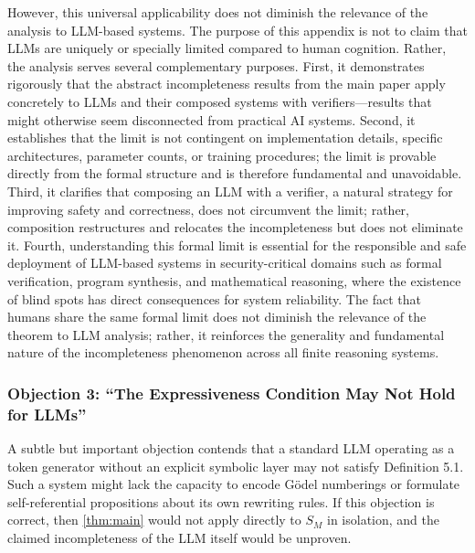 \documentclass[11pt]{article}
\begin{document}
However, this universal applicability does not diminish the relevance of the analysis to LLM-based systems. The purpose of this appendix is not to claim that LLMs are uniquely or specially limited compared to human cognition. Rather, the analysis serves several complementary purposes. First, it demonstrates rigorously that the abstract incompleteness results from the main paper apply concretely to LLMs and their composed systems with verifiers—results that might otherwise seem disconnected from practical AI systems. Second, it establishes that the limit is not contingent on implementation details, specific architectures, parameter counts, or training procedures; the limit is provable directly from the formal structure and is therefore fundamental and unavoidable. Third, it clarifies that composing an LLM with a verifier, a natural strategy for improving safety and correctness, does not circumvent the limit; rather, composition restructures and relocates the incompleteness but does not eliminate it. Fourth, understanding this formal limit is essential for the responsible and safe deployment of LLM-based systems in security-critical domains such as formal verification, program synthesis, and mathematical reasoning, where the existence of blind spots has direct consequences for system reliability. The fact that humans share the same formal limit does not diminish the relevance of the theorem to LLM analysis; rather, it reinforces the generality and fundamental nature of the incompleteness phenomenon across all finite reasoning systems.


\subsubsection{Objection 3: ``The Expressiveness Condition May Not Hold for LLMs''}

A subtle but important objection contends that a standard LLM operating as a token generator without an explicit symbolic layer may not satisfy Definition 5.1. Such a system might lack the capacity to encode Gödel numberings or formulate self-referential propositions about its own rewriting rules. If this objection is correct, then \ref{thm:main} would not apply directly to $S_M$ in isolation, and the claimed incompleteness of the LLM itself would be unproven.
\end{document}

